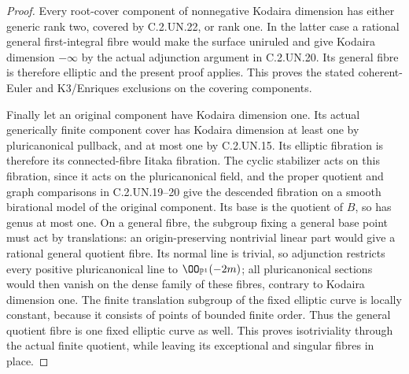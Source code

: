 \begin{proof}
Every root-cover component of nonnegative Kodaira
dimension has either generic rank two, covered by
C.2.UN.22, or rank one. In the latter case a rational
general first-integral fibre would make the surface
uniruled and give Kodaira dimension $-\infty$ by
the actual adjunction argument in C.2.UN.20.
Its general fibre is therefore elliptic and the
present proof applies. This proves the stated
coherent-Euler and K3/Enriques exclusions on the
covering components.

Finally let an original component have Kodaira
dimension one. Its actual generically finite
component cover has Kodaira dimension at least
one by pluricanonical pullback, and at most one
by C.2.UN.15. Its elliptic fibration is therefore
its connected-fibre Iitaka fibration. The cyclic
stabilizer acts on this fibration, since it acts
on the pluricanonical field, and the proper
quotient and graph comparisons in C.2.UN.19--20
give the descended fibration on a smooth
birational model of the original component.
Its base is the quotient of $B$, so has genus
at most one. On a general fibre, the subgroup
fixing a general base point must act by
translations: an origin-preserving nontrivial
linear part would give a rational general quotient
fibre. Its normal line is trivial, so adjunction
restricts every positive pluricanonical line to
$\OO_{\mathbb P^1}(-2m)$; all pluricanonical sections
would then vanish on the dense family of these
fibres, contrary to Kodaira dimension one. The finite translation
subgroup of the fixed elliptic curve is locally
constant, because it consists of points of
bounded finite order. Thus the general quotient
fibre is one fixed elliptic curve as well.
This proves isotriviality through the actual
finite quotient, while leaving its exceptional
and singular fibres in place.
\end{proof}
